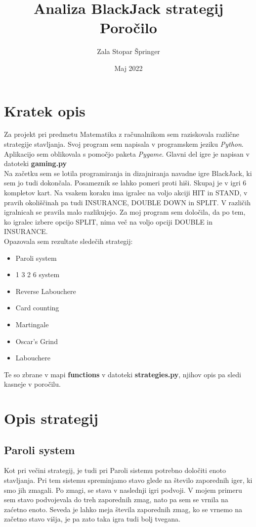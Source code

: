 \documentclass[a4paper, 16pt]{article}
\title{Analiza BlackJack strategij \\ Poročilo}
\date{Maj 2022}
\author{Zala Stopar Špringer}
\begin{document}
\maketitle

\section{Kratek opis}

Za projekt pri predmetu Matematika z računalnikom sem raziskovala različne strategije stavljanja. Svoj program sem napisala v programskem jeziku \textit{Python}. Aplikacijo sem oblikovala s pomočjo paketa \textit{Pygame}. Glavni del igre je napisan v datoteki \textbf{gaming.py}\\

\noindent Na začetku sem se lotila programiranja in dizajniranja navadne igre BlackJack, ki sem jo tudi dokončala. Posameznik se lahko pomeri proti hiši. Skupaj je v igri 6 kompletov kart. Na vsakem koraku ima igralec na voljo akciji HIT in STAND, v pravih okoliščinah pa tudi INSURANCE, DOUBLE DOWN in SPLIT. V različih igralnicah se pravila malo razlikujejo. Za moj program sem določila, da po tem, ko igralec izbere opcijo SPLIT, nima več na voljo opciji DOUBLE in INSURANCE. \\


\noindent Opazovala sem rezultate sledečih strategij:
\begin{itemize}
\item Paroli system
\item 1 3 2 6 system
\item Reverse Labouchere
\item Card counting
\item Martingale
\item Oscar’s Grind
\item Labouchere
\end{itemize}
Te so zbrane v mapi \textbf{functions} v datoteki \textbf{strategies.py}, njihov opis pa sledi kasneje v poročilu.

\section{Opis strategij}

\subsection{Paroli system}
Kot pri večini strategij, je tudi pri Paroli sistemu potrebno določiti enoto stavljanja. Pri tem sistemu spreminjamo stavo glede na število zaporednih iger, ki smo jih zmagali. Po zmagi, se stava v naslednji igri podvoji. V mojem primeru sem stavo podvojevala do treh zaporednih zmag, nato pa sem se vrnila na zaćetno enoto. Seveda je lahko meja števila zaporednih zmag, ko se vrnemo na začetno stavo višja, je pa zato taka igra tudi bolj tvegana.
\end{document}
